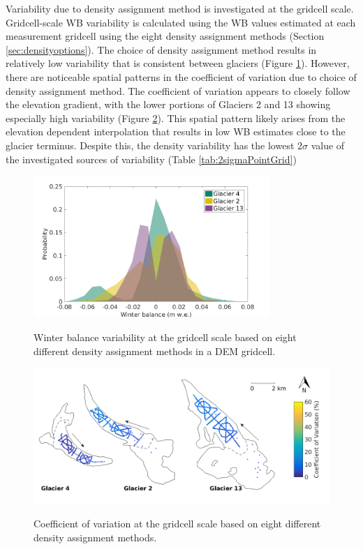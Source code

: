 \documentclass{sfuthesis}
\begin{document}
Variability due to density assignment method is investigated at the gridcell scale. Gridcell-scale WB variability is calculated using the WB values estimated at each measurement gridcell using the eight density assignment methods (Section \ref{sec:densityoptions}). The choice of density assignment method results in relatively low variability that is consistent between glaciers (Figure \ref{fig:SWEvar_Density_hist}). However, there are noticeable spatial patterns in the coefficient of variation due to choice of density assignment method. The coefficient of variation appears to closely follow the elevation gradient, with the lower portions of Glaciers 2 and 13 showing especially high variability (Figure \ref{fig:SWEvar_Density_map}). This spatial pattern likely arises from the elevation dependent interpolation that results in low WB estimates close to the glacier terminus. Despite this, the density variability has the lowest $2\sigma$ value of the investigated sources of variability (Table  \ref{tab:2sigmaPointGrid})

\begin{figure}[H]
	\centering
	\includegraphics[width =0.8\textwidth]{SWEvarDensityHIST.png}\\
	\caption{Winter balance variability at the gridcell scale based on eight different density assignment methods in a DEM gridcell.}
	\label{fig:SWEvar_Density_hist}
\end{figure}

\begin{figure}[H]
	\centering
	\includegraphics[width =\textwidth]{Map_cellstd_density.png}\\
	\caption{Coefficient of variation at the gridcell scale based on eight different density assignment methods.}
	\label{fig:SWEvar_Density_map}
\end{figure}
\end{document}
